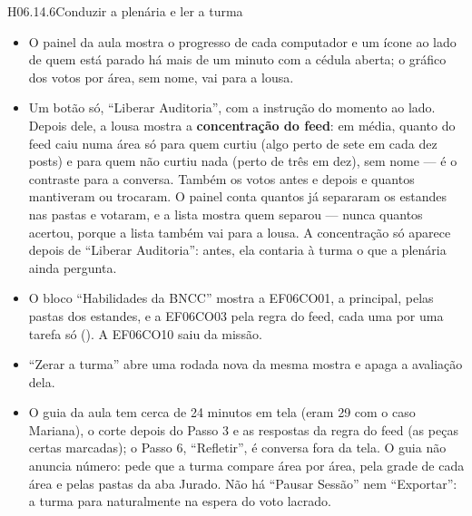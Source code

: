\begin{historia}{H06.14.6}{Conduzir a plenária e ler a turma}{\parcial}
\aceite
\begin{itemize}
  \item O painel da aula mostra o progresso de cada computador e um ícone ao
    lado de quem está parado há mais de um minuto com a cédula aberta; o
    gráfico dos votos por área, sem nome, vai para a lousa.
  \item Um botão só, \enquote{Liberar Auditoria}, com a instrução do momento
    ao lado. Depois dele, a lousa mostra a \textbf{concentração do feed}:
    em média, quanto do feed caiu numa área só para quem curtiu (algo perto de
    sete em cada dez posts) e para quem não curtiu nada (perto de três em
    dez), sem nome --- é o contraste para a conversa. Também os votos antes e
    depois e quantos mantiveram ou trocaram. O painel conta quantos já
    separaram os estandes nas pastas e votaram, e a lista mostra quem separou --- nunca quantos
    acertou, porque a lista também vai para a lousa. A concentração só aparece depois de \enquote{Liberar
    Auditoria}: antes, ela contaria à turma o que a plenária ainda pergunta.
  \item O bloco \enquote{Habilidades da BNCC} mostra a EF06CO01, a principal,
    pelas pastas dos estandes, e a EF06CO03 pela regra do feed, cada uma
    por uma tarefa só (). A EF06CO10 saiu da missão.
  \item \enquote{Zerar a turma} abre uma rodada nova da mesma mostra e apaga
    a avaliação dela.
  \item O guia da aula tem cerca de 24 minutos em tela (eram 29 com o caso
    Mariana), o corte depois do Passo 3 e as respostas da regra do feed (as
    peças certas marcadas); o Passo 6, \enquote{Refletir}, é conversa fora da
    tela. O guia não anuncia número: pede que a turma compare área por área,
    pela grade de cada área e pelas pastas da aba Jurado. Não há \enquote{Pausar Sessão} nem \enquote{Exportar}: a
    turma para naturalmente na espera do voto lacrado.
\end{itemize}
\end{historia}

